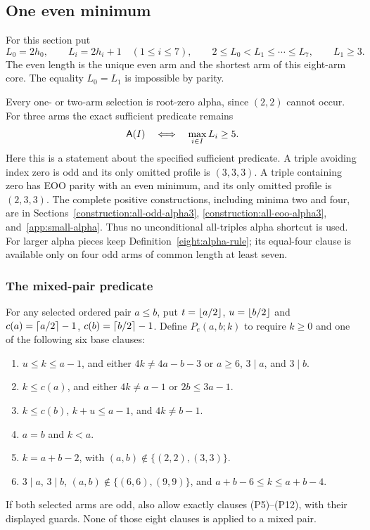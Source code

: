 \subsection{One even minimum}\label{eight:even-minimum}

For this section put
\[
 L_0=2h_0,\qquad L_i=2h_i+1\quad(1\le i\le7),
 \qquad2\le L_0<L_1\le\cdots\le L_7,
 \qquad L_1\ge3.
\]
The even length is the unique even arm and the shortest arm of this
eight-arm core.  The equality $L_0=L_1$ is impossible by parity.

Every one- or two-arm selection is root-zero alpha, since $(2,2)$
cannot occur.  For three arms the exact sufficient predicate remains
\begin{equation}\label{eight:small-triple-guard}
 \mathsf A(I)\quad\Longleftrightarrow\quad\max_{i\in I}L_i\ge5.
\end{equation}
Here this is a statement about the specified sufficient predicate.
A triple avoiding index zero is odd and its only omitted profile is
$(3,3,3)$.  A triple containing zero has EOO parity with an even
minimum, and its only omitted profile is $(2,3,3)$.
The complete positive constructions, including minima two and four,
are in Sections~\ref{construction:all-odd-alpha3},
\ref{construction:all-eoo-alpha3}, and~\ref{app:small-alpha}.
Thus no unconditional all-triples alpha shortcut is used.
For larger alpha pieces keep Definition~\ref{eight:alpha-rule}; its
equal-four clause is available only on four odd arms of common length
at least seven.

\subsubsection{The mixed-pair predicate}\label{eight:mixed-pairs}

For any selected ordered pair $a\le b$, put
$t=\left\lfloor a/2\right\rfloor$, $u=\left\lfloor b/2\right\rfloor$ and
$c(a)=\left\lceil a/2\right\rceil-1$, $c(b)=\left\lceil b/2\right\rceil-1$.  Define $P_e(a,b;k)$ to
require $k\ge0$ and one of the following six base clauses:
\begin{enumerate}
\item[(M1)] $u\le k\le a-1$, and either $4k\ne4a-b-3$ or
  $a\ge6$, $3\mid a$, and $3\mid b$.
\item[(M2)] $k\le c(a)$, and either $4k\ne a-1$ or $2b\le3a-1$.
\item[(M3)] $k\le c(b)$, $k+u\le a-1$, and $4k\ne b-1$.
\item[(M4)] $a=b$ and $k<a$.
\item[(M5)] $k=a+b-2$, with $(a,b)\notin\{(2,2),(3,3)\}$.
\item[(M6)] $3\mid a$, $3\mid b$, $(a,b)\notin\{(6,6),(9,9)\}$,
  and $a+b-6\le k\le a+b-4$.
\end{enumerate}
If both selected arms are odd, also allow exactly clauses
(P5)--(P12), with their displayed guards.  None of those eight clauses
is applied to a mixed pair.

